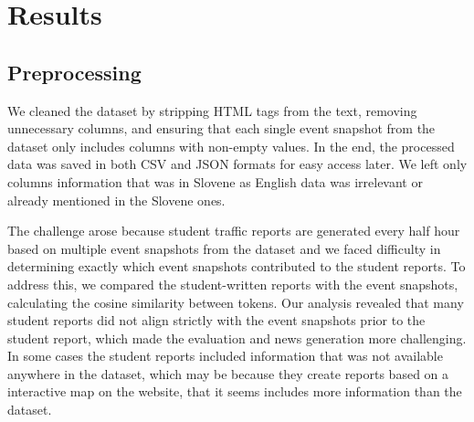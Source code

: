 \documentclass[fleqn,moreauthors,10pt]{ds_report}
\begin{document}

% 




\section*{Results}

\subsection*{Preprocessing}
We cleaned the dataset by stripping HTML tags from the text, removing unnecessary columns, and ensuring that each single event snapshot from the dataset only includes columns with non-empty values. In the end, the processed data was saved in both CSV and JSON formats for easy access later. We left only columns information that was in Slovene as English data was irrelevant or already mentioned in the Slovene ones.

The challenge arose because student traffic reports are generated every half hour based on multiple event snapshots from the dataset and we faced difficulty in determining exactly which event snapshots contributed to the student reports. To address this, we compared the student-written reports with the event snapshots, calculating the cosine similarity between tokens. Our analysis revealed that many student reports did not align strictly with the event snapshots prior to the student report, which made the evaluation and news generation more challenging. In some cases the student reports included information that was not available anywhere in the dataset, which may be because they create reports based on a interactive map on the website, that it seems includes more information than the dataset.
\end{document}
